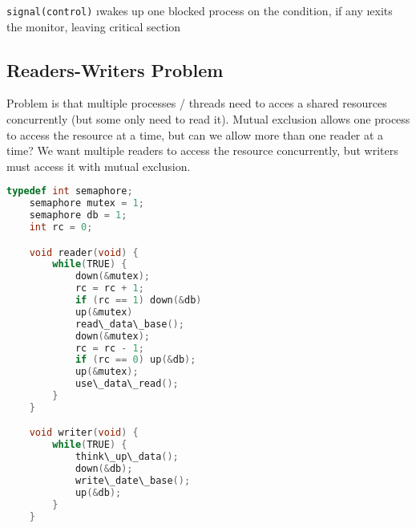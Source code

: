 \documentclass{article}
\begin{document}
    \noindent \texttt{signal(control)}
    \bl 
    \i wakes up one blocked process on the condition, if any
    \i exits the monitor, leaving critical section
    \el 

\subsection{Readers-Writers Problem}

    Problem is that multiple processes / threads need to acces a shared resources concurrently (but some only need to read it). Mutual exclusion allows one process to access the resource at a time, but can we allow more than one reader at a time? We want multiple readers to access the resource concurrently, but writers must access it with mutual exclusion. 

    \begin{lstlisting}[language=C]
    typedef int semaphore;
    semaphore mutex = 1;
    semaphore db = 1;
    int rc = 0;

    void reader(void) {
        while(TRUE) {
            down(&mutex);
            rc = rc + 1;
            if (rc == 1) down(&db)
            up(&mutex)
            read\_data\_base();
            down(&mutex);
            rc = rc - 1;
            if (rc == 0) up(&db);
            up(&mutex);
            use\_data\_read();
        }
    }

    void writer(void) {
        while(TRUE) {
            think\_up\_data();
            down(&db);
            write\_date\_base();
            up(&db);
        }
    }
    \end{lstlisting}
\end{document}
